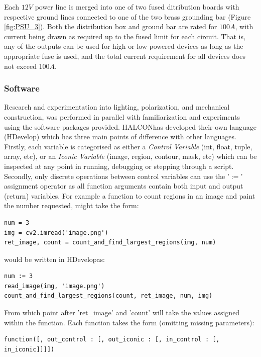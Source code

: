 \documentclass[fleqn,twoside]{article}
\begin{document}
Each $12V$ power line is merged into one of two fused ditribution boards with respective ground lines connected to one of the two brass grounding bar (Figure \ref{fig:PSU_3}). Both the distribution box and ground bar are rated for $100A$, with current being drawn as required up to the fused limit for each circuit. That is, any of the outputs can be used for high or low powered devices as long as the appropriate fuse is used, and the total current requirement for all devices does not exceed $100A$. 





\subsubsection{Software}
\label{sec:software}

Research and experimentation into lighting, polarization, and mechanical construction, was performed in parallel with familiarization and experiments using the software packages provided. HALCON\texttrademark has developed their own language (HDevelop\texttrademark) which has three main points of difference with other languages. Firstly, each variable is categorised as either a \textit{Control Variable} (int, float, tuple, array, etc), or an \textit{Iconic Variable} (image, region, contour, mask, etc) which can be inspected at any point in running, debugging or stepping through a script. Secondly, only discrete operations between control variables can use the '$:=$' assignment operator as all function arguments contain both input and output (return) variables. For example a function to count regions in an image and paint the number requested, might take the form:

\begin{lstlisting}
num = 3
img = cv2.imread('image.png')
ret_image, count = count_and_find_largest_regions(img, num)
\end{lstlisting} 

would be written in HDevelop\texttrademark as:

\begin{lstlisting}
num := 3
read_image(img, 'image.png')
count_and_find_largest_regions(count, ret_image, num, img)
\end{lstlisting} 

From which point after 'ret\_image' and 'count' will take the values assigned within the function. Each function takes the form (omitting missing parameters):

\begin{lstlisting}
function([, out_control : [, out_iconic : [, in_control : [, in_iconic]]]])
\end{lstlisting} 
\end{document}
